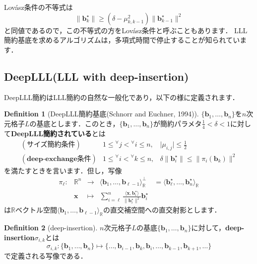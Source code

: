 \documentclass[a4j, dvipdfmx]{jsarticle}
\theoremstyle{definition}
\newtheorem{definition}{Definition}[section]
\begin{document}
Lovász条件の不等式は$$\lVert\boldsymbol{b}_k^\star\rVert\ge (\delta-\mu_{k, k-1}^2)\lVert \boldsymbol{b}_{k-1}^\star\rVert^2$$と同値であるので，この不等式の方をLovász条件と呼ぶこともあります．
LLL簡約基底を求めるアルゴリズムは，多項式時間で停止することが知られています．

\subsection{DeepLLL(LLL with deep-insertion)}

DeepLLL簡約はLLL簡約の自然な一般化であり，以下の様に定義されます．

\begin{definition}[DeepLLL簡約基底(Schnorr and Euchner, 1994)]
$\lbrace\boldsymbol{b}_1,\ldots,\boldsymbol{b}_n\rbrace$を$n$次元格子$L$の基底とします．このとき，$\lbrace\boldsymbol{b}_1,\ldots,\boldsymbol{b}_n\rbrace$が簡約パラメタ$\frac{1}{4}<\delta<1$に対して\textbf{DeepLLL簡約されている}とは
$$
\begin{array}{lll}
(\textbf{サイズ簡約条件})&1\le{}^\forall j<{}^\forall i\le n,&\lvert\mu_{i, j}\rvert\le \frac{1}{2}\\
(\textbf{deep-exchange条件})&1\le{}^\forall i<{}^\forall k\le n,&\delta\lVert \boldsymbol{b}_{i}^\star\rVert\le \lVert \pi_{i}(\boldsymbol{b}_k)\rVert^2
\end{array}
$$
を満たすときを言います．但し，写像
$$
\begin{array}{llclc}
\pi_\ell : &\mathbb{R}^n &\longrightarrow &\langle \boldsymbol{b}_1, \dots, \boldsymbol{b}_{\ell-1} \rangle_\mathbb{R}^\perp&=\langle \boldsymbol{b}_\ell^\star, \dots, \boldsymbol{b}_n^\star \rangle_\mathbb{R}\\
&\boldsymbol{x} &\longmapsto &\displaystyle\sum_{i = \ell}^n \frac{\langle \boldsymbol{x}, \boldsymbol{b}_i^\star \rangle}{ \| \boldsymbol{b}_i^\star \|^2 } \boldsymbol{b}_i^\star
\end{array}
$$
は$\mathbb{R}$ベクトル空間$\langle \boldsymbol{b}_1, \dots, \boldsymbol{b}_{\ell-1} \rangle_\mathbb{R}$の直交補空間への直交射影とします．
\end{definition}

\begin{definition}[deep-insertion]
$n$次元格子$L$の基底$\{\boldsymbol{b}_1,\ldots,\boldsymbol{b}_n\}$に対して，\textbf{deep-insertion}$\sigma_{i, k}$とは
$$
\sigma_{i, k}: \{\boldsymbol{b}_1,\ldots, \boldsymbol{b}_n\}\longmapsto \lbrace\ldots,\boldsymbol{b}_{i-1},\boldsymbol{b}_k,\boldsymbol{b}_i,\ldots,\boldsymbol{b}_{k-1},\boldsymbol{b}_{k+1},\ldots\rbrace
$$
で定義される写像である．
\end{definition}
\end{document}

